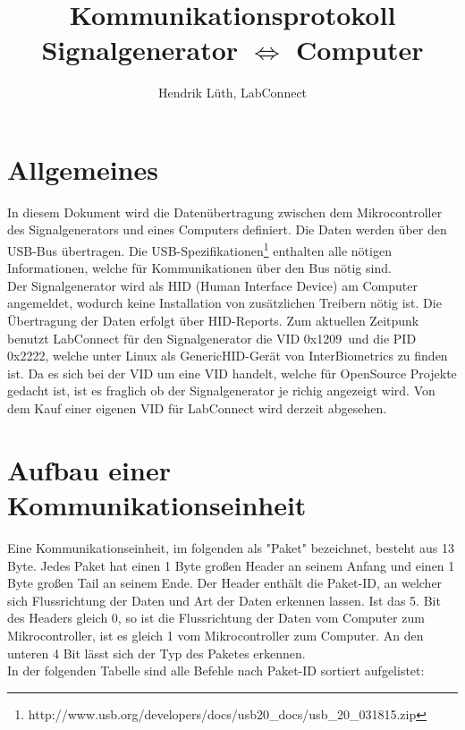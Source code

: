 \documentclass[a4paper,12pt]{article}
\title{Kommunikationsprotokoll \\Signalgenerator $\Leftrightarrow$ Computer}
\author{Hendrik Lüth, LabConnect}
\newcommand{\VID}{0x1209}
\newcommand{\PID}{0x2222}
\begin{document}
\maketitle
\tableofcontents
\pagebreak

\section{Allgemeines}
In diesem Dokument wird die Datenübertragung zwischen dem Mikrocontroller des Signalgenerators und eines Computers definiert. Die Daten werden über den USB-Bus übertragen. Die USB-Spezifikationen\footnote{http://www.usb.org/developers/docs/usb20\_docs/usb\_20\_031815.zip} enthalten alle nötigen Informationen, welche für Kommunikationen über den Bus nötig sind.\\
Der Signalgenerator wird als HID (Human Interface Device) am Computer angemeldet, wodurch keine Installation von zusätzlichen Treibern nötig ist. Die Übertragung der Daten erfolgt über HID-Reports. Zum aktuellen Zeitpunk benutzt LabConnect für den Signalgenerator die VID \VID\ und die PID \PID, welche unter Linux als GenericHID-Gerät von InterBiometrics zu finden ist. Da es sich bei der VID um eine VID handelt, welche für OpenSource Projekte gedacht ist, ist es fraglich ob der Signalgenerator je richig angezeigt wird. Von dem Kauf einer eigenen VID für LabConnect wird derzeit abgesehen.

\section{Aufbau einer Kommunikationseinheit}
Eine Kommunikationseinheit, im folgenden als "Paket" bezeichnet, besteht aus 13 Byte. Jedes Paket hat einen 1 Byte großen Header an seinem Anfang und einen 1 Byte großen Tail an seinem Ende. Der Header enthält die Paket-ID, an welcher sich Flussrichtung der Daten und Art der Daten erkennen lassen. Ist das 5. Bit des Headers gleich 0, so ist die Flussrichtung der Daten vom Computer zum Mikrocontroller, ist es gleich 1 vom Mikrocontroller zum Computer. An den unteren 4 Bit lässt sich der Typ des Paketes erkennen.\\
In der folgenden Tabelle sind alle Befehle nach Paket-ID sortiert aufgelistet:\\
\end{document}
